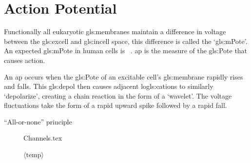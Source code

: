 \documentclass[../../Orator]{subfiles}
\begin{document}
\section{Action Potential}

Functionally all eukaryotic \glspl{gls:membrane} maintain a difference in voltage between the \gls{gls:excell} and \gls{gls:incell} space, this difference is called the `\gls{gls:mPote}'. An expected \gls{gls:mPote} in human cells is ~\cite{}.
\gls{ap} is the measure of the \gls{gls:Pote} that causes action.

An \gls{ap} occurs when the \gls{gls:Pote} of an excitable cell's \gls{gls:membrane} rapidly rises and falls. This \gls{gls:depol} then causes adjacent lo\glspl{gls:cation} to similarly `depolarize', creating a chain reaction in the form of a `wavelet'.
The voltage fluctuations take the form of a rapid upward spike followed by a rapid fall.

``All-or-none'' principle

\begin{figure}[H]
    \centering
    {Channels.tex}
    \caption{ $\langle \text{temp} \rangle$ }\label{fig:Channels}
\end{figure}
\end{document}
